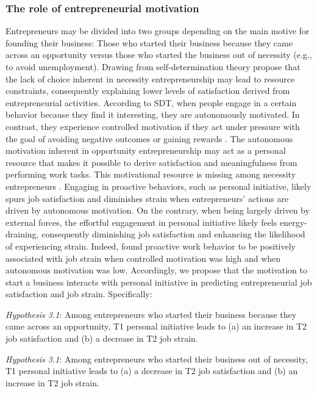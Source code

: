 \documentclass[man, 12pt, a4paper, noextraspace]{apa6}
\begin{document}
\subsubsection{The role of entrepreneurial motivation}

Entrepreneurs may be divided into two groups depending on the main motive for founding their business: Those who started their business because they came across an opportunity versus those who started the business out of necessity (e.g., to avoid unemployment). 
Drawing from self-determination theory \parencite[SDT,][]{Ryan.2001}\textcite{Ryff2019} propose that the lack of choice inherent in necessity entrepreneurship may lead to resource constraints, consequently explaining lower levels of satisfaction derived from entrepreneurial activities. 
According to SDT, when people engage in a certain behavior because they find it interesting, they are autonomously motivated. 
In contrast, they experience controlled motivation if they act under pressure with the goal of avoiding negative outcomes or gaining rewards \parencite{Ryan.2001}. 
The autonomous motivation inherent in opportunity entrepreneurship may act as a personal resource that makes it possible to derive satisfaction and meaningfulness from performing work tasks. 
This motivational resource is missing among necessity entrepreneurs \parencite[e.g.,][]{Block2009}.
Engaging in proactive behaviors, such as personal initiative, likely spurs job satisfaction and diminishes strain when entrepreneurs' actions are driven by autonomous motivation. 
On the contrary, when being largely driven by external forces, the effortful engagement in personal initiative likely feels energy-draining, consequently diminishing job satisfaction and enhancing the likelihood of experiencing strain. 
Indeed, \textcite{Strauss2017} found proactive work behavior to be positively associated with job strain when controlled motivation was high and when autonomous motivation was low. 
Accordingly, we propose that the motivation to start a business interacts with personal initiative in predicting entrepreneurial job satisfaction and job strain. Specifically: \par 

\textit{Hypothesis 3.1}: Among entrepreneurs who started their business because they came across an opportunity, T1 personal initiative leads to (a) an increase in T2 job satisfaction and (b) a decrease in T2 job strain. 

\textit{Hypothesis 3.1}: Among entrepreneurs who started their business out of necessity, T1 personal initiative leads to (a) a decrease in T2 job satisfaction and (b) an increase in T2 job strain. \par
\end{document}
